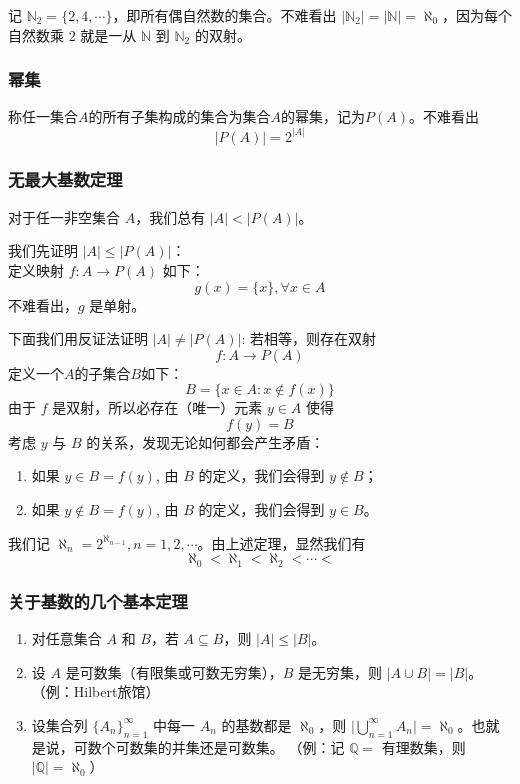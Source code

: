 \documentclass{ctexbook}
\newcommand{\no}{\noindent}
\newcommand{\pro}{\no{\bf 证明：}}
\newcommand{\EXP}{\no {\bf 例}\quad}
\newcommand{\ITEMS}{\begin{enumerate}[leftmargin=4em]}
\newcommand{\ITEME}{\end{enumerate}}
\begin{document}
\EXP 记 $\mathbb{N}_2=\{2,4,\cdots\}$，即所有偶自然数的集合。不难看出 $\lvert\mathbb{N}_2\rvert=\lvert\mathbb{N}\rvert=\aleph_0$，因为每个自然数乘 $2$ 就是一从 $\mathbb{N}$ 到 $\mathbb{N}_2$ 的双射。

\subsubsection{幂集}
称任一集合$A$的所有子集构成的集合为集合$A$的幂集，记为$P(A)$。不难看出
\[
\lvert P(A) \rvert = 2^{\lvert A \rvert}
\]

\subsubsection{无最大基数定理}

对于任一非空集合 $A$，我们总有 $\lvert A \rvert<\lvert P(A) \rvert$。
\smallskip

\pro

我们先证明 $\lvert A \rvert \le \lvert P(A) \rvert$：\\
定义映射 $f:A\rightarrow P(A)$ 如下：
\[ 
	g(x)=\{x\}, \forall x \in A
\] 
不难看出，$g$ 是单射。

下面我们用反证法证明 $\lvert A \rvert \ne \lvert P(A) \rvert$:
若相等，则存在双射
\[
	f:A\rightarrow P(A)
\]
定义一个$A$的子集合$B$如下：
\[
B = \{x\in A: x\notin f(x)\}
\]
由于 $f$ 是双射，所以必存在（唯一）元素 $y\in A$ 使得
\[
f(y) = B
\]
考虑 $y$ 与 $B$ 的关系，发现无论如何都会产生矛盾：
\ITEMS
	\item 如果 $y\in B=f(y)$, 由 $B$ 的定义，我们会得到 $y\notin B$；
	\item 如果 $y\notin B=f(y)$, 由 $B$ 的定义，我们会得到 $y\in B$。
\ITEME

\no {\bf 注} 我们记 $\aleph_n=2^{\aleph_{n-1}}, n=1, 2, \cdots$。由上述定理，显然我们有 
\[
	\aleph_0 < \aleph_1 < \aleph_2 <\cdots< 
\]

\subsubsection{关于基数的几个基本定理}
\ITEMS
\item 对任意集合 $A$ 和 $B$，若 $A\subseteq B$，则 $\lvert A \rvert \le \lvert B \rvert$。
\item 设 $A$ 是可数集（有限集或可数无穷集），$B$ 是无穷集，则 $\lvert A\cup B \rvert= \lvert B \rvert$。
     （例：Hilbert旅馆）
\item 设集合列 $\{A_n\}_{n=1}^{\infty}$ 中每一 $A_n$ 的基数都是 $\aleph_0$，则 $\lvert \bigcup_{n=1}^\infty A_n \rvert=\aleph_0 $。也就是说，可数个可数集的并集还是可数集。 （例：记 $\mathbb{Q}=$ 有理数集，则 $\lvert\mathbb{Q}\rvert=\aleph_0 $） 
\ITEME
\end{document}
